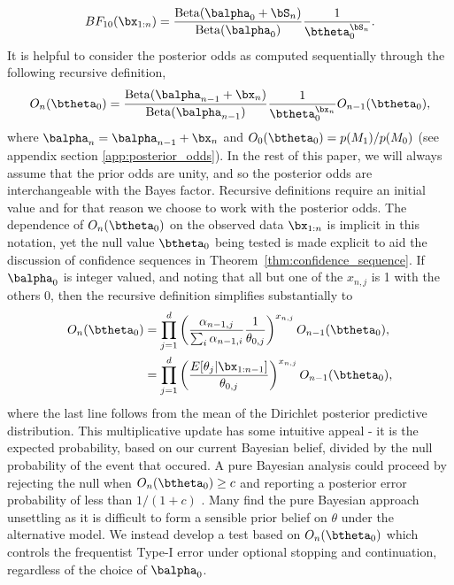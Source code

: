 \documentclass[11pt]{article}
\newcommand{\Beta}{\mathrm{Beta}}
\begin{document}
\begin{equation}
  \label{eq:simplified_bayes_factor}
 BF_{10}(\bx_{1:n}) = \frac{\Beta(\balpha_0 + \bS_n)}{\Beta(\balpha_0)}\frac{1}{\btheta_0^{\bS_n}}.
\end{equation}
It is helpful to consider the posterior odds as computed sequentially through the following recursive definition,
\begin{equation}
  \label{eq:update_rule}
  O_{n}(\btheta_0) = \frac{\Beta(\balpha_{n-1} + \bx_n)}{\Beta(\balpha_{n-1})}\frac{1}{\btheta_0^{\bx_n}} O_{n-1}(\btheta_0),
\end{equation}
where $\balpha_n = \balpha_{n-1}+\bx_n$ and $O_0(\btheta_0)=p(M_1)/p(M_0)$ (see appendix section \ref{app:posterior_odds}).
In the rest of this paper, we will always assume that the prior odds are unity, and so the posterior odds are interchangeable with the Bayes factor.
Recursive definitions require an initial value and for that reason we choose to work with the posterior odds.
The dependence of $O_n(\btheta_0)$ on the observed data $\bx_{1:n}$ is implicit in this notation, yet the null value $\btheta_0$ being tested is made explicit to aid the discussion of confidence sequences in Theorem~\ref{thm:confidence_sequence}.
If $\balpha_0$ is integer valued, and noting that all but one of the $x_{n,j}$ is 1 with the others 0, then the recursive definition simplifies substantially to
\begin{align}
  \label{eq:simplified_bayes_factor}
  O_{n}(\btheta_0) &= \prod_{j=1}^{d} \left(\frac{\alpha_{n-1,j}}{\sum_i \alpha_{n-1,i}} \frac{1}{\theta_{0,j}}\right)^{x_{n,j}} O_{n-1}(\btheta_0),\\
  &=\prod_{j=1}^{d}\left(\frac{E[\theta_j|\bx_{1:n-1}]}{\theta_{0,j}} \right)^{x_{n,j}} O_{n-1}(\btheta_0),
\end{align}
where the last line follows from the mean of the Dirichlet posterior predictive distribution.
This multiplicative update has some intuitive appeal - it is the expected probability, based on our current Bayesian belief, divided by the null probability of the event that occured.
A pure Bayesian analysis could proceed by rejecting the null when $O_n(\btheta_0) \geq c$ and reporting a posterior error probability of less than $1/(1+c)$ \citep[Chapter 5]{bernardo}.
Many find the pure Bayesian approach unsettling as it is difficult to form a sensible prior belief on $\theta$ under the alternative model.
We instead develop a test based on $O_n(\btheta_0)$ which controls the frequentist Type-I error under optional stopping and continuation, regardless of the choice of $\balpha_0$.
\end{document}
